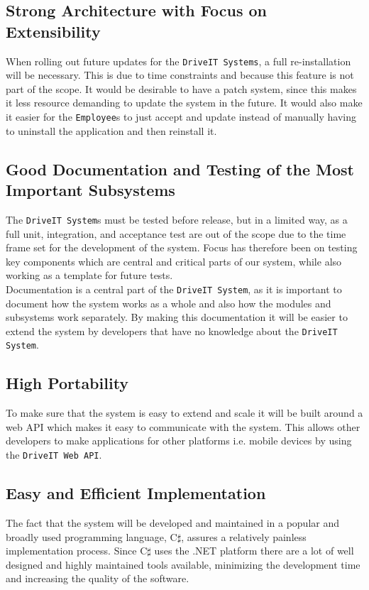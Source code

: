 \subsection{Strong Architecture with Focus on Extensibility}
When rolling out future updates for the \texttt{DriveIT Systems}, a full re-installation will be necessary. This is due to time constraints and because this feature is not part of the scope. It would be desirable to have a patch system, since this makes it less resource demanding to update the system in the future. It would also make it easier for the \texttt{Employee}s to just accept and update instead of manually having to uninstall the application and then reinstall it.\\

\subsection{Good Documentation and Testing of the Most Important Subsystems}
The \texttt{DriveIT System}s must be tested before release, but in a limited way, as a full unit, integration, and acceptance test are out of the scope due to the time frame set for the development of the system. Focus has therefore been on testing key components which are central and critical parts of our system, while also working as a template for future tests.\\

Documentation is a central part of the \texttt{DriveIT System}, as it is important to document how the system works as a whole and also how the modules and subsystems work separately. By making this documentation it will be easier to extend the system by developers that have no knowledge about the \texttt{DriveIT System}.\\

\subsection{High Portability}
To make sure that the system is easy to extend and scale it will be built around a web API which makes it easy to communicate with the system. This allows other developers to make applications for other platforms i.e. mobile devices by using the \texttt{DriveIT Web API}.\\

\subsection{Easy and Efficient Implementation}
The fact that the system will be developed and maintained in a popular and broadly used programming language, C$\sharp$, assures a relatively painless implementation process. Since C$\sharp$ uses the .NET platform there are a lot of well designed and highly maintained tools available, minimizing the development time and increasing the quality of the software.\\

